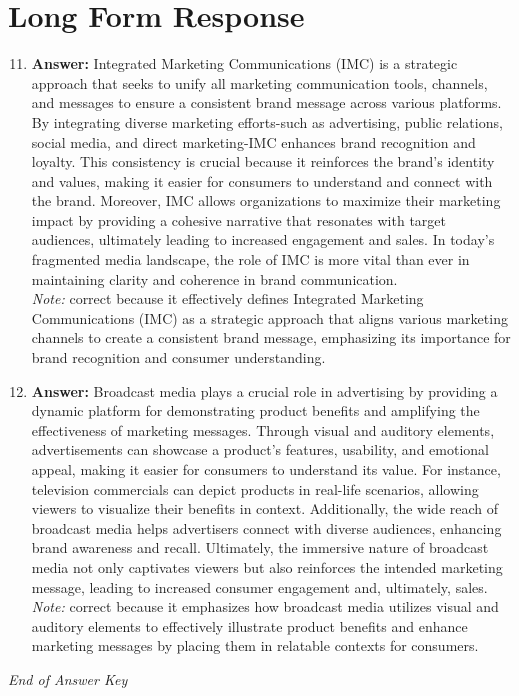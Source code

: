 \documentclass[12pt]{article}
\begin{document}
\section*{Long Form Response}
\begin{enumerate}[label=\arabic*.]
\setcounter{enumi}{10}
\item \textbf{Answer:} Integrated Marketing Communications (IMC) is a strategic approach that seeks to unify all marketing communication tools, channels, and messages to ensure a consistent brand message across various platforms. By integrating diverse marketing efforts-such as advertising, public relations, social media, and direct marketing-IMC enhances brand recognition and loyalty. This consistency is crucial because it reinforces the brand's identity and values, making it easier for consumers to understand and connect with the brand. Moreover, IMC allows organizations to maximize their marketing impact by providing a cohesive narrative that resonates with target audiences, ultimately leading to increased engagement and sales. In today's fragmented media landscape, the role of IMC is more vital than ever in maintaining clarity and coherence in brand communication.
\\ \textit{Note:} correct because it effectively defines Integrated Marketing Communications (IMC) as a strategic approach that aligns various marketing channels to create a consistent brand message, emphasizing its importance for brand recognition and consumer understanding.
\item \textbf{Answer:} Broadcast media plays a crucial role in advertising by providing a dynamic platform for demonstrating product benefits and amplifying the effectiveness of marketing messages. Through visual and auditory elements, advertisements can showcase a product's features, usability, and emotional appeal, making it easier for consumers to understand its value. For instance, television commercials can depict products in real-life scenarios, allowing viewers to visualize their benefits in context. Additionally, the wide reach of broadcast media helps advertisers connect with diverse audiences, enhancing brand awareness and recall. Ultimately, the immersive nature of broadcast media not only captivates viewers but also reinforces the intended marketing message, leading to increased consumer engagement and, ultimately, sales.
\\ \textit{Note:} correct because it emphasizes how broadcast media utilizes visual and auditory elements to effectively illustrate product benefits and enhance marketing messages by placing them in relatable contexts for consumers.
\end{enumerate}

\vfill
\noindent\textit{End of Answer Key}
\end{document}
